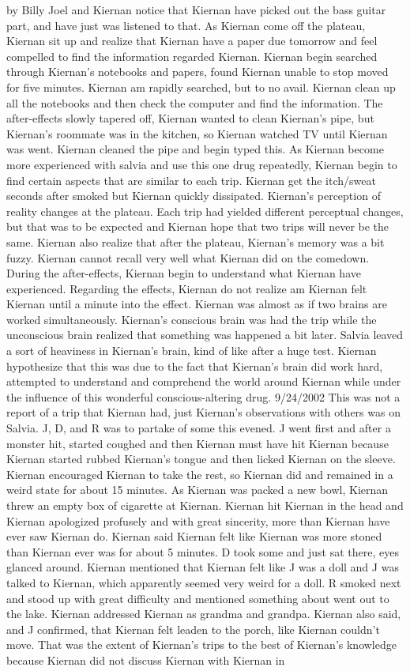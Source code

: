 \documentclass[12pt]{book}
\begin{document}
by Billy Joel and Kiernan notice that Kiernan have picked out the bass guitar part, and have just was listened to that. As Kiernan come off the plateau, Kiernan sit up and realize that Kiernan have a paper due tomorrow and feel compelled to find the information regarded Kiernan. Kiernan begin searched through Kiernan's notebooks and papers, found Kiernan unable to stop moved for five minutes. Kiernan am rapidly searched, but to no avail. Kiernan clean up all the notebooks and then check the computer and find the information. The after-effects slowly tapered off, Kiernan wanted to clean Kiernan's pipe, but Kiernan's roommate was in the kitchen, so Kiernan watched TV until Kiernan was went. Kiernan cleaned the pipe and begin typed this. As Kiernan become more experienced with salvia and use this one drug repeatedly, Kiernan begin to find certain aspects that are similar to each trip. Kiernan get the itch/sweat seconds after smoked but Kiernan quickly dissipated. Kiernan's perception of reality changes at the plateau. Each trip had yielded different perceptual changes, but that was to be expected and Kiernan hope that two trips will never be the same. Kiernan also realize that after the plateau, Kiernan's memory was a bit fuzzy. Kiernan cannot recall very well what Kiernan did on the comedown. During the after-effects, Kiernan begin to understand what Kiernan have experienced. Regarding the effects, Kiernan do not realize am Kiernan felt Kiernan until a minute into the effect. Kiernan was almost as if two brains are worked simultaneously. Kiernan's conscious brain was had the trip while the unconscious brain realized that something was happened a bit later. Salvia leaved a sort of heaviness in Kiernan's brain, kind of like after a huge test. Kiernan hypothesize that this was due to the fact that Kiernan's brain did work hard, attempted to understand and comprehend the world around Kiernan while under the influence of this wonderful conscious-altering drug. 9/24/2002 This was not a report of a trip that Kiernan had, just Kiernan's observations with others was on Salvia. J, D, and R was to partake of some this evened. J went first and after a monster hit, started coughed and then Kiernan must have hit Kiernan because Kiernan started rubbed Kiernan's tongue and then licked Kiernan on the sleeve. Kiernan encouraged Kiernan to take the rest, so Kiernan did and remained in a weird state for about 15 minutes. As Kiernan was packed a new bowl, Kiernan threw an empty box of cigarette at Kiernan. Kiernan hit Kiernan in the head and Kiernan apologized profusely and with great sincerity, more than Kiernan have ever saw Kiernan do. Kiernan said Kiernan felt like Kiernan was more stoned than Kiernan ever was for about 5 minutes. D took some and just sat there, eyes glanced around. Kiernan mentioned that Kiernan felt like J was a doll and J was talked to Kiernan, which apparently seemed very weird for a doll. R smoked next and stood up with great difficulty and mentioned something about went out to the lake. Kiernan addressed Kiernan as grandma and grandpa. Kiernan also said, and J confirmed, that Kiernan felt leaden to the porch, like Kiernan couldn't move. That was the extent of Kiernan's trips to the best of Kiernan's knowledge because Kiernan did not discuss Kiernan with Kiernan in 
\end{document}
